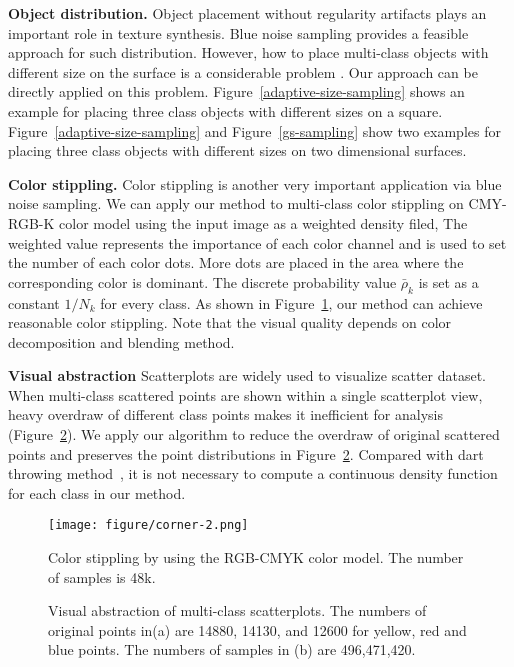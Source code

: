 \textbf{Object distribution.}
Object placement without regularity artifacts plays an important role in texture synthesis.
Blue noise sampling provides a feasible approach for such distribution.
However,
how to place multi-class objects with different size on the surface is a considerable problem .
Our approach can be directly applied on this problem.
Figure~\ref{adaptive-size-sampling} shows an example for placing three class objects with different sizes on a square.
Figure~\ref{adaptive-size-sampling} and Figure~\ref{gs-sampling} show two examples for placing three class objects with different sizes on two dimensional surfaces.

\textbf{Color stippling.}
Color stippling is another very important application via blue noise sampling.
We can apply our method to multi-class color stippling on CMY-RGB-K color model using the input image as a weighted density filed,
The weighted value represents the importance of each color channel and is used to set the number of each color dots.
More dots are placed in the
area where the corresponding color is dominant.
The discrete probability value $\bar\rho_k$ is set as a constant $1/N_k$ for every class.
As shown in Figure~\ref{Color stippling},
our method can achieve reasonable color stippling.
Note that the visual quality depends on color decomposition and blending method.

\textbf{Visual abstraction}
Scatterplots are widely used to visualize scatter dataset.
When multi-class scattered points are shown within a single scatterplot view, heavy overdraw of different class points makes it inefficient for analysis (Figure~\ref{visual-abstraction}).
We apply our algorithm to reduce the overdraw of original scattered points and preserves the point distributions in Figure~\ref{visual-abstraction}.
Compared with dart throwing method~\cite{wei:2010:multi,chen:2014:visual},
it is not necessary to compute a continuous density function for each class in our method.



\begin{figure}[htb]
  \centering
    \texttt{[image: figure/corner-2.png]}
   \caption{Color stippling by using the RGB-CMYK color model.
  The number of samples is 48k.  }\label{Color stippling}
\end{figure}

\begin{figure}[htb]
  \centering

  \caption{Visual abstraction of multi-class scatterplots.
   The numbers of original points in(a) are 14880, 14130, and 12600 for yellow, red and blue points.
   The numbers of samples in (b) are 496,471,420.}
   \label{visual-abstraction}
\end{figure}
